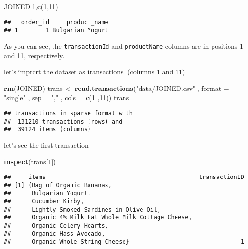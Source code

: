 \documentclass[
]{article}
\newenvironment{Shaded}{\begin{snugshade}}{\end{snugshade}}
\newcommand{\AttributeTok}[1]{\textcolor[rgb]{0.13,0.29,0.53}{#1}}
\newcommand{\DecValTok}[1]{\textcolor[rgb]{0.00,0.00,0.81}{#1}}
\newcommand{\FunctionTok}[1]{\textcolor[rgb]{0.13,0.29,0.53}{\textbf{#1}}}
\newcommand{\NormalTok}[1]{#1}
\newcommand{\OtherTok}[1]{\textcolor[rgb]{0.56,0.35,0.01}{#1}}
\newcommand{\StringTok}[1]{\textcolor[rgb]{0.31,0.60,0.02}{#1}}
\begin{document}
\begin{Shaded}
\begin{Highlighting}[]
\NormalTok{JOINED[}\DecValTok{1}\NormalTok{,}\FunctionTok{c}\NormalTok{(}\DecValTok{1}\NormalTok{,}\DecValTok{11}\NormalTok{)]}
\end{Highlighting}
\end{Shaded}

\begin{verbatim}
##   order_id     product_name
## 1        1 Bulgarian Yogurt
\end{verbatim}

As you can see, the \texttt{transactionId} and \texttt{productName}
columns are in positions 1 and 11, respectively.

let's imprort the dataset as transactions. (columns 1 and 11)

\begin{Shaded}
\begin{Highlighting}[]
\FunctionTok{rm}\NormalTok{(JOINED)}
\NormalTok{trans }\OtherTok{\textless{}{-}} \FunctionTok{read.transactions}\NormalTok{(}\StringTok{"data/JOINED.csv"}\NormalTok{ , }\AttributeTok{format =} \StringTok{"single"}\NormalTok{ , }\AttributeTok{sep =} \StringTok{","}\NormalTok{ , }\AttributeTok{cols =} \FunctionTok{c}\NormalTok{(}\DecValTok{1}\NormalTok{ ,}\DecValTok{11}\NormalTok{))}
\NormalTok{trans}
\end{Highlighting}
\end{Shaded}

\begin{verbatim}
## transactions in sparse format with
##  131210 transactions (rows) and
##  39124 items (columns)
\end{verbatim}

let's see the first transaction

\begin{Shaded}
\begin{Highlighting}[]
\FunctionTok{inspect}\NormalTok{(trans[}\DecValTok{1}\NormalTok{])}
\end{Highlighting}
\end{Shaded}

\begin{verbatim}
##     items                                            transactionID
## [1] {Bag of Organic Bananas,                                      
##      Bulgarian Yogurt,                                            
##      Cucumber Kirby,                                              
##      Lightly Smoked Sardines in Olive Oil,                        
##      Organic 4% Milk Fat Whole Milk Cottage Cheese,               
##      Organic Celery Hearts,                                       
##      Organic Hass Avocado,                                        
##      Organic Whole String Cheese}                                1
\end{verbatim}
\end{document}
